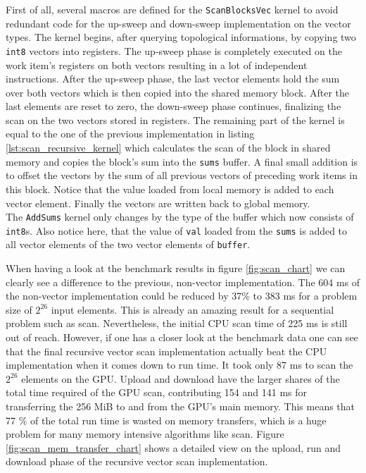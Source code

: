 

First of all, several macros are defined for the \lstinline!ScanBlocksVec! kernel to avoid redundant code for the up-sweep and down-sweep implementation on the vector types. The kernel begins, after querying topological informations, by copying two \lstinline!int8! vectors into registers. The up-sweep phase is completely executed on the work item's registers on both vectors resulting in a lot of independent instructions. After the up-sweep phase, the last vector elements hold the sum over both vectors which is then copied into the shared memory block. After the last elements are reset to zero, the down-sweep phase continues, finalizing the scan on the two vectors stored in registers. The remaining part of the kernel is equal to the one of the previous implementation in listing \ref{lst:scan_recursive_kernel} which calculates the scan of the block in shared memory and copies the block's sum into the \lstinline!sums! buffer. A final small addition is to offset the vectors by the sum of all previous vectors of preceding work items in this block. Notice that the value loaded from local memory is added to each vector element. Finally the vectors are written back to global memory. \\
The \lstinline!AddSums! kernel only changes by the type of the buffer which now consists of \lstinline!int8!s. Also notice here, that the value of \lstinline!val! loaded from the \lstinline!sums! is added to all vector elements of the two vector elements of \lstinline!buffer!.

When having a look at the benchmark results in figure \ref{fig:scan_chart} we can clearly see a difference to the previous, non-vector implementation. The 604 ms of the non-vector implementation could be reduced by 37\% to 383 ms for a problem size of $2^{26}$ input elements. This is already an amazing result for a sequential problem such as scan. Nevertheless, the initial CPU scan time of 225 ms is still out of reach.
However, if one has a closer look at the benchmark data one can see that the final recursive vector scan implementation actually beat the CPU implementation when it comes down to run time. It took only 87 ms to scan the $2^{26}$ elements on the GPU. Upload and download have the larger shares of the total time required of the GPU scan, contributing 154 and 141 ms for transferring the 256 MiB to and from the GPU's main memory. This means that 77 \% of the total run time is wasted on memory transfers, which is a huge problem for many memory intensive algorithms like scan. Figure \ref{fig:scan_mem_transfer_chart} shows a detailed view on the upload, run and download phase of the recursive vector scan implementation.

